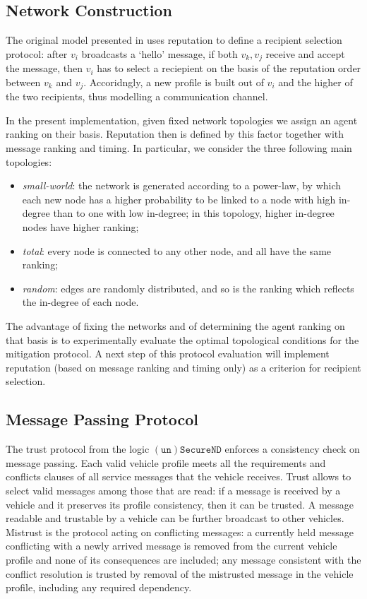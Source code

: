 \documentclass[compsoc, conference, letterpaper, 10pt, times]{IEEEtran}
\begin{document}
\subsection{Network Construction}\label{sec:network}

The original model presented in \cite{glenford} uses reputation to define a recipient selection protocol: after $v_{i}$ broadcasts a `hello' message, if both $v_{k}, v_{j}$ receive and accept the message, then $v_{i}$ has to select a reciepient on the basis of the reputation order between $v_{k}$ and $v_{j}$. Accoridngly, a new profile is built out of $v_{i}$ and the higher of the two recipients, thus modelling a communication channel.

In the present implementation, given fixed network topologies we assign an agent ranking on their basis. Reputation then is defined by this factor together with message ranking and timing. In particular, we consider the three following main topologies:

\begin{itemize}
\item \textit{small-world}: the network is generated according to a power-law, by which each new node has a higher probability to be linked to a node with high in-degree than to one with low in-degree; in this topology, higher in-degree nodes have higher ranking;
\item \textit{total}: every node is connected to any other node, and all have the same ranking;
\item \textit{random}: edges are randomly distributed, and so is the ranking which reflects the in-degree of each node.
\end{itemize}
The advantage of fixing the networks and of determining the agent ranking on that basis is to experimentally evaluate the optimal topological conditions for the mitigation protocol. A next step of this protocol evaluation will implement reputation (based on message ranking and timing only) as a criterion for recipient selection.

\subsection{Message Passing Protocol}

The trust protocol from the logic $\mathtt{(un)SecureND}$ enforces a consistency check on message passing. Each valid vehicle profile meets all the requirements and conflicts clauses of all service messages that the vehicle receives. Trust allows to select valid messages among those that are read: if a message is received by a vehicle and it preserves its profile consistency, then it can be trusted. A message readable and trustable by a vehicle can be further broadcast to other vehicles. Mistrust is the protocol acting on conflicting messages: a currently held message conflicting with a newly arrived message is removed from the current vehicle profile and none of its consequences are included; any message consistent with the conflict resolution is trusted by removal of the mistrusted message in the vehicle profile, including any required dependency.
\end{document}
